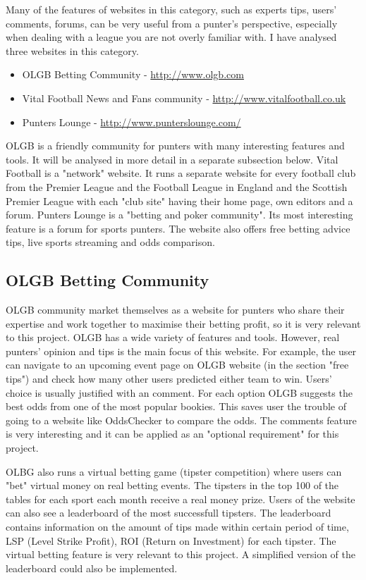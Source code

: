 Many of the features of websites in this category, such as experts tips, users' comments, forums, can be very useful from a punter's perspective, especially when dealing with a league you are not overly familiar with. I have analysed three websites in this category.
	
\begin{itemize}
	\item OLGB Betting Community - \url{http://www.olgb.com}
	\item Vital Football News and Fans community - \url{http://www.vitalfootball.co.uk}
	\item Punters Lounge - \url{http://www.punterslounge.com/}
\end{itemize}

OLGB is a friendly community for punters with many interesting features and tools. It will be analysed in more detail in a separate subsection below. Vital Football is a "network" website. It runs a separate website for every football club from the Premier League and the Football League in England and the Scottish Premier League with each "club site" having their home page, own editors and a forum. Punters Lounge is a "betting and poker community". Its most interesting feature is a forum for sports punters. The website also offers free betting advice tips, live sports streaming and odds comparison.
	
\subsection{OLGB Betting Community}
\label{subsec:olgb_req}
OLGB community market themselves as a website for punters who share their expertise and work together to maximise their betting profit, so it is very relevant to this project. OLGB has a wide variety of features and tools. However, real punters' opinion and tips is the main focus of this website. For example, the user can navigate to an upcoming event page on OLGB website (in the section "free tips") and check how many other users predicted either team to win. Users' choice is usually justified with an comment. For each option OLGB suggests the best odds from one of the most popular bookies. This saves user the trouble of going to a website like OddsChecker\cite{oddschecker} to compare the odds. The comments feature is very interesting and it can be applied as an "optional requirement" for this project.

OLBG also runs a virtual betting game (tipster competition) where users can "bet" virtual money on real betting events. The tipsters in the top 100 of the tables for each sport each month receive a real money prize. Users of the website can also see a leaderboard of the most successfull tipsters. The leaderboard contains information on the amount of tips made within certain period of time, LSP (Level Strike Profit), ROI (Return on Investment) for each tipster. The virtual betting feature is very relevant to this project. A simplified version of the leaderboard could also be implemented. 

